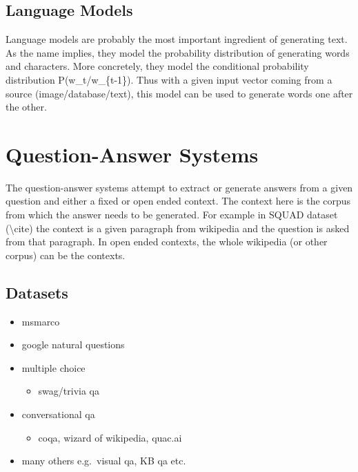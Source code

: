 \documentclass[]{krantz}
\providecommand{\tightlist}{%
  \setlength{\itemsep}{0pt}\setlength{\parskip}{0pt}}
\begin{document}
\hypertarget{language-models}{%
\subsection{Language Models}\label{language-models}}

Language models are probably the most important ingredient of generating text. As the name implies, they model the probability distribution of generating words and characters. More concretely, they model the conditional probability distribution P(w\_t/w\_\{t-1\}). Thus with a given input vector coming from a source (image/database/text), this model can be used to generate words one after the other.

\hypertarget{question-answer-systems}{%
\section{Question-Answer Systems}\label{question-answer-systems}}

The question-answer systems attempt to extract or generate answers from a given question and either a fixed or open ended context. The context here is the corpus from which the answer needs to be generated. For example in SQUAD dataset (\textbackslash{}cite) the context is a given paragraph from wikipedia and the question is asked from that paragraph. In open ended contexts, the whole wikipedia (or other corpus) can be the contexts.

\hypertarget{datasets-1}{%
\subsection{Datasets}\label{datasets-1}}

\begin{itemize}
\tightlist
\item
  msmarco
\item
  google natural questions
\item
  multiple choice

  \begin{itemize}
  \tightlist
  \item
    swag/trivia qa
  \end{itemize}
\item
  conversational qa

  \begin{itemize}
  \tightlist
  \item
    coqa, wizard of wikipedia, quac.ai
  \end{itemize}
\item
  many others e.g.~visual qa, KB qa etc.
\end{itemize}
\end{document}
